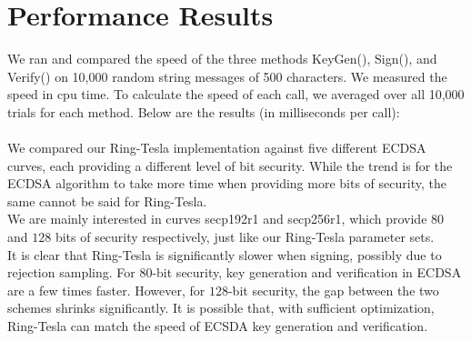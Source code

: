 \documentclass[letterpaper,twocolumn,10pt]{article}
\begin{document}
\section{Performance Results}
We ran and compared the speed of the three methods KeyGen(), Sign(), and Verify() on 10,000 random string messages of 500 characters. We measured the speed in cpu time. To calculate the speed of each call, we averaged over all 10,000 trials for each method. Below are the results (in milliseconds per call):\\

\\

We compared our Ring-Tesla implementation against five different ECDSA curves, each providing a different level of bit security. While the trend is for the ECDSA algorithm to take more time when providing more bits of security, the same cannot be said for Ring-Tesla.\\

We are mainly interested in curves secp192r1 and secp256r1, which provide $80$ and $128$ bits of security respectively, just like our Ring-Tesla parameter sets.\\
It is clear that Ring-Tesla is significantly slower when signing, possibly due to rejection sampling. For $80$-bit security, key generation and verification in ECDSA are a few times faster. However, for $128$-bit security, the gap between the two schemes shrinks significantly. It is possible that, with sufficient optimization, Ring-Tesla can match the speed of ECSDA key generation and verification.


{\footnotesize 
}


\theendnotes
\end{document}
